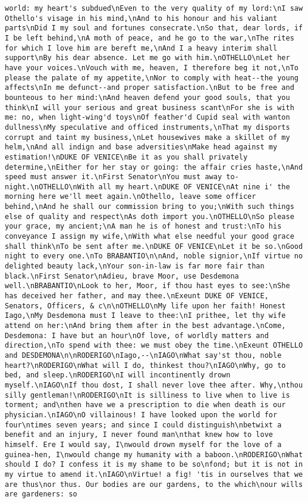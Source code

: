 \begin{verbatim}
world: my heart's subdued\nEven to the very quality of my lord:\nI saw Othello's visage in his mind,\nAnd to his honour and his valiant parts\nDid I my soul and fortunes consecrate.\nSo that, dear lords, if I be left behind,\nA moth of peace, and he go to the war,\nThe rites for which I love him are bereft me,\nAnd I a heavy interim shall support\nBy his dear absence. Let me go with him.\nOTHELLO\nLet her have your voices.\nVouch with me, heaven, I therefore beg it not,\nTo please the palate of my appetite,\nNor to comply with heat--the young affects\nIn me defunct--and proper satisfaction.\nBut to be free and bounteous to her mind:\nAnd heaven defend your good souls, that you think\nI will your serious and great business scant\nFor she is with me: no, when light-wing'd toys\nOf feather'd Cupid seal with wanton dullness\nMy speculative and officed instruments,\nThat my disports corrupt and taint my business,\nLet housewives make a skillet of my helm,\nAnd all indign and base adversities\nMake head against my estimation!\nDUKE OF VENICE\nBe it as you shall privately determine,\nEither for her stay or going: the affair cries haste,\nAnd speed must answer it.\nFirst Senator\nYou must away to-night.\nOTHELLO\nWith all my heart.\nDUKE OF VENICE\nAt nine i' the morning here we'll meet again.\nOthello, leave some officer behind,\nAnd he shall our commission bring to you;\nWith such things else of quality and respect\nAs doth import you.\nOTHELLO\nSo please your grace, my ancient;\nA man he is of honest and trust:\nTo his conveyance I assign my wife,\nWith what else needful your good grace shall think\nTo be sent after me.\nDUKE OF VENICE\nLet it be so.\nGood night to every one.\nTo BRABANTIO\n\nAnd, noble signior,\nIf virtue no delighted beauty lack,\nYour son-in-law is far more fair than black.\nFirst Senator\nAdieu, brave Moor, use Desdemona well.\nBRABANTIO\nLook to her, Moor, if thou hast eyes to see:\nShe has deceived her father, and may thee.\nExeunt DUKE OF VENICE, Senators, Officers, & c\n\nOTHELLO\nMy life upon her faith! Honest Iago,\nMy Desdemona must I leave to thee:\nI prithee, let thy wife attend on her:\nAnd bring them after in the best advantage.\nCome, Desdemona: I have but an hour\nOf love, of worldly matters and direction,\nTo spend with thee: we must obey the time.\nExeunt OTHELLO and DESDEMONA\n\nRODERIGO\nIago,--\nIAGO\nWhat say'st thou, noble heart?\nRODERIGO\nWhat will I do, thinkest thou?\nIAGO\nWhy, go to bed, and sleep.\nRODERIGO\nI will incontinently drown myself.\nIAGO\nIf thou dost, I shall never love thee after. Why,\nthou silly gentleman!\nRODERIGO\nIt is silliness to live when to live is torment; and\nthen have we a prescription to die when death is our physician.\nIAGO\nO villainous! I have looked upon the world for four\ntimes seven years; and since I could distinguish\nbetwixt a benefit and an injury, I never found man\nthat knew how to love himself. Ere I would say, I\nwould drown myself for the love of a guinea-hen, I\nwould change my humanity with a baboon.\nRODERIGO\nWhat should I do? I confess it is my shame to be so\nfond; but it is not in my virtue to amend it.\nIAGO\nVirtue! a fig! 'tis in ourselves that we are thus\nor thus. Our bodies are our gardens, to the which\nour wills are gardeners: so 
\end{verbatim}
